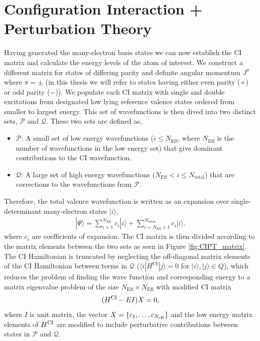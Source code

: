\documentclass[10pt,a4paper, twoside, openright]{report}
\begin{document}
\section{Configuration Interaction + Perturbation Theory}
Having generated the many-electron basis states we can now establish the CI matrix and calculate the energy levels of the atom of interest. We construct a different matrix for states of differing parity and definite angular momentum $J^{\pi}$ where $\pi = \pm$ (in this thesis we will refer to states having either even parity ($+$) or odd parity ($-$)). We populate each CI matrix with single and double excitations from designated low lying reference valence states ordered from smaller to largest energy.  This set of wavefunctions is then dived into two distinct sets, $\mathcal{P}$ and $\mathcal{Q}$. These two sets are defined as,
\begin{itemize}
\item $\mathcal{P}$: A small set of low energy wavefunctions ($i \leq N_{\text{Eff}}$, where $N_{\text{Eff}}$ is the number of wavefunctions in the low energy set) that give dominant contributions to the CI wavefunction.
\item $\mathcal{Q}$: A large set of high energy wavefunctions ($N_{\text{Eff}}<i \leq N_{\text{total}}$) that are corrections to the wavefunctions from $\mathcal{P}$.
\end{itemize}
Therefore, the total valence wavefunction is written as an expansion over single-determinant many-electron states $|i \rangle $,
\begin{align} 
| \Psi \rangle = \sum_{i=1}^{N_{\text{Eff}}} c_{i}|i\rangle + \sum_{i = N_{\text{Eff}} + 1}^{N_{\text{total}}} c_{i}|i\rangle . \label{eq:psi}
\end{align}
where $c_i$ are coefficients of expansion. The CI matrix is then divided according to the matrix elements between the two sets as seen in Figure \ref{fig:CIPT_matrix}.  The CI Hamiltonian is truncated by neglecting the off-diagonal matrix elements of the CI Hamiltonian between terms in $\mathcal{Q}$ ($\langle i | H^{\text{CI}} | j \rangle = 0 $ for $|i\rangle, |j\rangle \in Q$),  which reduces the problem of finding the wave function and corresponding energy to a matrix eigenvalue problem of the size $N_{\text{Eff}} \times N_{\text{Eff}}$ with modified CI matrix
\begin{equation} \label{eq:CI}
(H^{\rm CI} - EI)X=0,
\end{equation}
where $I$ is unit matrix, the vector $X = \{c_1, \dots, c_{N_{\rm eff}}\}$ and the low energy matrix elements of $H^{\rm CI}$ are modified to include perturbative contributions between states in $\mathcal{P}$ and $\mathcal{Q}$.
\end{document}
